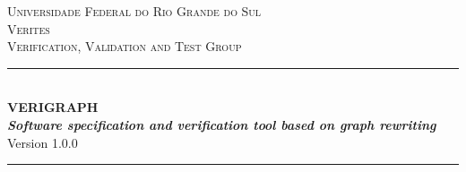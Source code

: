 \documentclass[12pt]{article}
\newcommand{\verigraphversion}{1.0.0}
\begin{document}
\begin{titlepage}

\newcommand{\HRule}{\rule{\linewidth}{0.5mm}} %

\center %
 

\textsc{\normalsize Universidade Federal do Rio Grande do Sul}\\[1.0cm] %
\textsc{\Large Verites}\\[0.2cm] %
\textsc{\large Verification, Validation and Test Group}\\[0.2cm] %


\HRule \\[0.4cm]
{ \huge \bfseries \LARGE{VERIGRAPH} \\ [1.0cm]
\emph{\large{Software specification and verification tool based on graph rewriting}}
}\\[0.5cm]

Version \verigraphversion \\[0.4cm] %
\HRule \\[1.0cm]
 




\end{titlepage}
\end{document}
